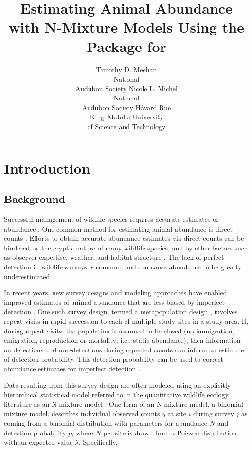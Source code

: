 \documentclass[codesnippet]{jss}
\author{Timothy D. Meehan\\National\\Audubon Society \And
	Nicole L. Michel\\National\\Audubon Society \And
	H{\aa}vard Rue\\King Abdulla University\\of Science and Technology}
\title{Estimating Animal Abundance with N-Mixture Models Using the 
\pkg{R-INLA} Package for \proglang{R}}
\begin{document}
	
\section[Introduction]{Introduction}
\subsection[Background]{Background}
Successful management of wildlife species requires accurate estimates of 
abundance  
\citep{Yoccoz_Nichols_Boulinier_2001}. One common method for estimating 
animal abundance is direct counts 
\citep{Pollock_Nichols_Simons_Farnsworth_Bailey_Sauer_2002}. Efforts to 
obtain accurate abundance estimates via direct counts can be hindered by the 
cryptic nature of many wildlife species, and by other factors such as 
observer expertise, weather, and habitat structure 
\citep{Denes_Silveira_Beissinger_2015}. The lack of perfect detection in 
wildlife surveys is common, and can cause abundance to be greatly 
underestimated  
\citep{Wenger_Freeman_2008, Joseph_Elkin_Martin_Possingham_2009}.

In recent years, new survey designs and modeling approaches have enabled improved estimates of animal abundance that are less biased by imperfect detection \citep{Denes_Silveira_Beissinger_2015}. One such survey design, termed a metapopulation design \citep{Kery_Royle_2010}, involves repeat visits in rapid succession to each of multiple study sites in a study area. If, during repeat visits, the population is assumed to be closed (no immigration, emigration, reproduction or mortality; i.e., static abundance), then information on detections and non-detections during repeated counts can inform an estimate of detection probability. This detection probability can be used to correct abundance estimates for imperfect detection \citep{Royle_2004}.

Data resulting from this survey design are often modeled using an explicitly 
hierarchical statistical model referred to in the quantitative wildlife 
ecology literature as an N-mixture model  
\citep{Royle_Nichols_2003, Dodd_Dorazio_2004, Royle_2004, 
Kery_Royle_Schmid_2005}. One form of an N-mixture model, a binomial mixture 
model, describes individual observed counts $y$ at site $i$ during survey 
$j$ as coming from a binomial distribution with parameters for abundance $N$ 
and detection probability $p$, where $N$ per site is drawn from a Poisson 
distribution with an expected value $\lambda$. Specifically,
\end{document}

